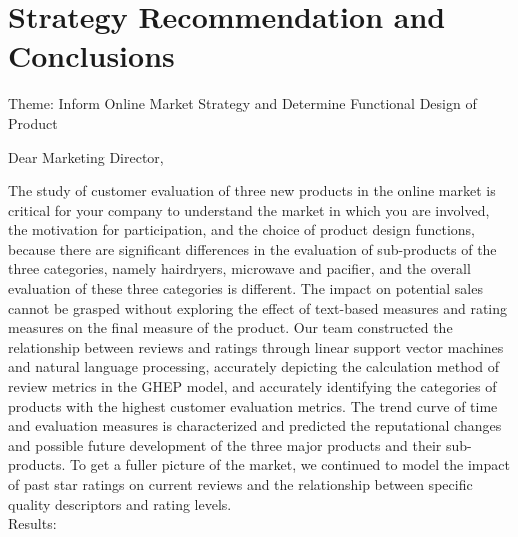 \documentclass{mcmthesis}
\begin{document}
\section{Strategy Recommendation and Conclusions}
\noindent Theme: Inform Online Market Strategy and Determine Functional Design of Product	
\begin{letter}{Dear Marketing Director,}
	
	
\qquad The study of customer evaluation of three new products in the online market is critical for your company to understand the market in which you are involved, the motivation for participation, and the choice of product design functions, because there are significant differences in the evaluation of sub-products of the three categories, namely hairdryers, microwave and pacifier, and the overall evaluation of these three categories is different. The impact on potential sales cannot be grasped without exploring the effect of text-based measures and rating measures on the final measure of the product. Our team constructed the relationship between reviews and ratings through linear support vector machines and natural language processing, accurately depicting the calculation method of review metrics in the GHEP model, and accurately identifying the categories of products with the highest customer evaluation metrics. The trend curve of time and evaluation measures is characterized and predicted the reputational changes and possible future development of the three major products and their sub-products. To get a fuller picture of the market, we continued to model the impact of past star ratings on current reviews and the relationship between specific quality descriptors and rating levels.\\
Results:


\end{letter}
\end{document}
